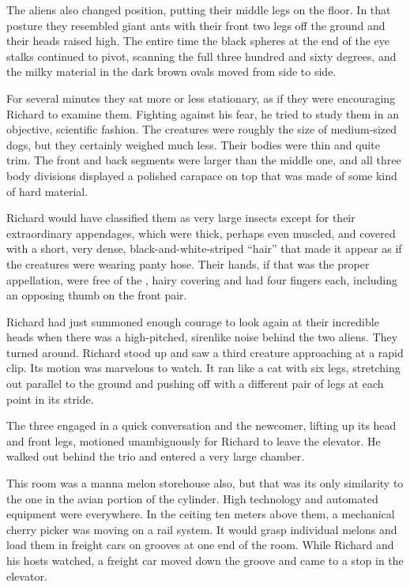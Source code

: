 \documentclass[]{article}
\begin{document}
{The aliens also changed position, putting their middle legs on the floor.  In that posture they resembled giant ants with their front two legs off the ground and their heads raised high.  The entire time the black spheres at the end of the eye stalks continued to pivot, scanning the full three hundred and sixty degrees, and the milky material in the dark brown ovals moved from side to side.

For several minutes they sat more or less stationary, as if they were encouraging Richard to examine them.  Fighting against his fear, he tried to study them in an objective, scientific fashion.  The creatures were roughly the size of medium-sized dogs, but they certainly weighed much less.  Their bodies were thin and quite trim.  The front and back segments were larger than the middle one, and all three body divisions displayed a polished carapace on top that was made of some kind of hard material.

Richard would have classified them as very large insects except for their extraordinary appendages, which were thick, perhaps even muscled, and covered with a short, very dense, black-and-white-striped “hair” that made it appear as if the creatures were wearing panty hose.  Their hands, if that was the proper appellation, were free of the , hairy covering and had four fingers each, including an opposing thumb on the front pair.

Richard had just summoned enough courage to look again at their incredible heads when there was a high-pitched, sirenlike noise behind the two aliens.  They turned around.  Richard stood up and saw a third creature approaching at a rapid clip.  Its motion was marvelous to watch.  It ran like a cat with six legs, stretching out parallel to the ground and pushing off with a different pair of legs at each point in its stride.

The three engaged in a quick conversation and the newcomer, lifting up its head and front legs, motioned unambiguously for Richard to leave the elevator.  He walked out behind the trio and entered a very large chamber.

This room was a manna melon storehouse also, but that was its only similarity to the one in the avian portion of the cylinder.  High technology and automated equipment were everywhere.  In the ceiting ten meters above them, a mechanical cherry picker was moving on a rail system.  It would grasp individual melons and load them in freight cars on grooves at one end of the room.  While Richard and his hosts watched, a freight car moved down the groove and came to a stop in the elevator.

}
\end{document}
